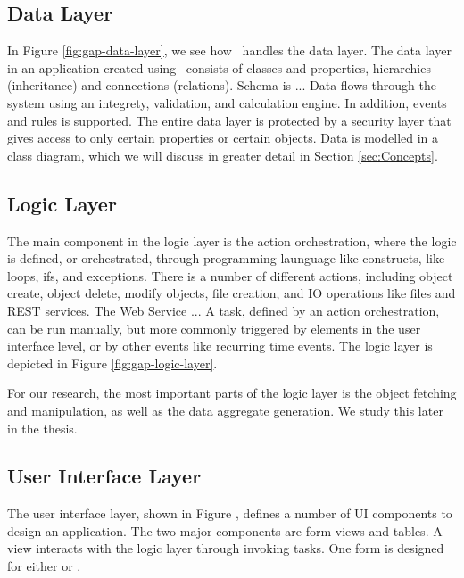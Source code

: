 \subsection{Data Layer}
\label{sub:Data Layer}
In Figure \ref{fig:gap-data-layer}, we see how \gap~handles the data layer. The data layer in an application created using \gap~consists of classes and properties, hierarchies (inheritance) and connections (relations). Schema is ... Data flows through the system using an integrety, validation, and calculation engine. In addition, events and rules is supported. The entire data layer is protected by a security layer that gives access to only certain properties or certain objects. Data is modelled in a class diagram, which we will discuss in greater detail in Section \ref{sec:Concepts}.

\subsection{Logic Layer}
\label{sub:Logic Layer}
The main component in the logic layer is the action orchestration, where the logic is defined, or orchestrated, through programming launguage-like constructs, like loops, ifs,  and exceptions. There is a number of different actions, including object create, object delete, modify objects, file creation, and IO operations like files and REST services. The Web Service ... A task, defined by an action orchestration, can be run manually, but more commonly triggered by elements in the user interface level, or by other events like recurring time events. The logic layer is depicted in Figure \ref{fig:gap-logic-layer}.

For our research, the most important parts of the logic layer is the object fetching and manipulation, as well as the data aggregate generation. We study this later in the thesis.

\subsection{User Interface Layer}
\label{sub:User Interface Layer}
The user interface layer, shown in Figure \cite{fig:gap-user-interface-layer}, defines a number of UI components to design an application. The two major components are form views and tables. A view interacts with the logic layer through invoking tasks. One form is designed for either  or .


